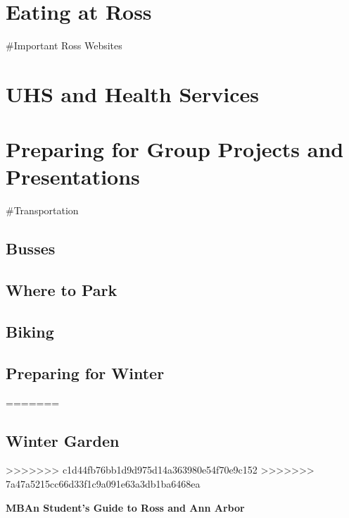 \documentclass[
]{book}
\begin{document}
\hypertarget{eating-at-ross}{%
\chapter{Eating at Ross}\label{eating-at-ross}}

\#Important Ross Websites

\hypertarget{uhs-and-health-services}{%
\chapter{UHS and Health Services}\label{uhs-and-health-services}}

\hypertarget{preparing-for-group-projects-and-presentations}{%
\chapter{Preparing for Group Projects and Presentations}\label{preparing-for-group-projects-and-presentations}}

\#Transportation

\hypertarget{busses}{%
\section{Busses}\label{busses}}

\hypertarget{where-to-park}{%
\section{Where to Park}\label{where-to-park}}

\hypertarget{biking}{%
\section{Biking}\label{biking}}

\hypertarget{preparing-for-winter}{%
\section{Preparing for Winter}\label{preparing-for-winter}}
=======
\hypertarget{winter-garden}{%
\section{Winter Garden}\label{winter-garden}}
>>>>>>> c1d44fb76bb1d9d975d14a363980e54f70e9c152
>>>>>>> 7a47a5215cc66d33f1c9a091e63a3db1ba6468ea

\textbf{MBAn Student's Guide to Ross and Ann Arbor}
\end{document}
